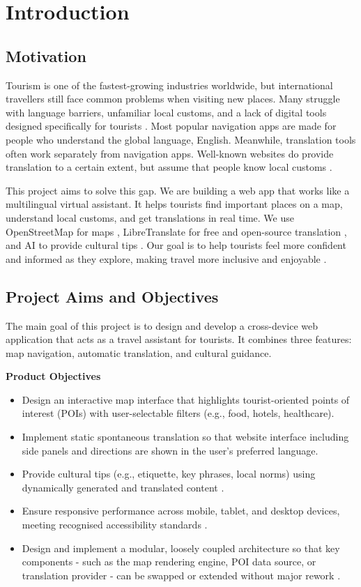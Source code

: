 \chapter{Introduction}

\section{Motivation}

Tourism is one of the fastest-growing industries worldwide, but international travellers still face common problems when visiting new places. Many struggle with language barriers, unfamiliar local customs, and a lack of digital tools designed specifically for tourists \cite{Liebling2020}. Most popular navigation apps are made for people who understand the global language, English. Meanwhile, translation tools often work separately from navigation apps. Well-known websites do provide translation to a certain extent, but assume that people know local customs \cite{navUX,localizationUX}.

This project aims to solve this gap. We are building a web app that works like a multilingual virtual assistant. It helps tourists find important places on a map, understand local customs, and get translations in real time. We use OpenStreetMap for maps \cite{osm}, LibreTranslate for free and open-source translation \cite{libretranslate}, and AI to provide cultural tips \cite{cultureai}. Our goal is to help tourists feel more confident and informed as they explore, making travel more inclusive and enjoyable \cite{inclusiveTourism}.

\section{Project Aims and Objectives}

The main goal of this project is to design and develop a cross-device web application that acts as a travel assistant for tourists. It combines three features: map navigation, automatic translation, and cultural guidance.

\textbf{Product Objectives}
\begin{itemize}
  \item Design an interactive map interface that highlights tourist-oriented points of interest (POIs) with user-selectable filters (e.g., food, hotels, healthcare).
  \item Implement static spontaneous translation so that website interface including side panels and directions are shown in the user’s preferred language.
  \item Provide cultural tips (e.g., etiquette, key phrases, local norms) using dynamically generated and translated content \cite{gpt_culturetips}.
  \item Ensure responsive performance across mobile, tablet, and desktop devices, meeting recognised accessibility standards \cite{responsiveDesign}.
  \item Design and implement a modular, loosely coupled architecture so that key components - such as the map rendering engine, POI data source, or translation provider - can be swapped or extended without major rework \cite{modularApps}.
\end{itemize}

